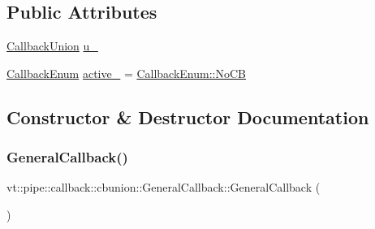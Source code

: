 \subsection*{Public Attributes}
\begin{DoxyCompactItemize}
\item 
\hyperlink{unionvt_1_1pipe_1_1callback_1_1cbunion_1_1_callback_union}{Callback\+Union} \hyperlink{structvt_1_1pipe_1_1callback_1_1cbunion_1_1_general_callback_aed6003f71632d33c5281872d7841cb4f}{u\+\_\+}
\item 
\hyperlink{namespacevt_1_1pipe_1_1callback_1_1cbunion_ac8b41526501e39ec73a5fde238b996b4}{Callback\+Enum} \hyperlink{structvt_1_1pipe_1_1callback_1_1cbunion_1_1_general_callback_ad141aa2bd6b52ff3ac0469c54786649f}{active\+\_\+} = \hyperlink{namespacevt_1_1pipe_1_1callback_1_1cbunion_ac8b41526501e39ec73a5fde238b996b4a29782dfeb3ca8db391fbf8e43f240dc2}{Callback\+Enum\+::\+No\+CB}
\end{DoxyCompactItemize}


\subsection{Constructor \& Destructor Documentation}
\mbox{\label{structvt_1_1pipe_1_1callback_1_1cbunion_1_1_general_callback_a7249abce459f2922bc2454bb45ea1eb4}} 
\subsubsection{\texorpdfstring{General\+Callback()}{GeneralCallback()}\hspace{0.1cm}{\footnotesize\ttfamily [1/12]}}
{\footnotesize\ttfamily vt\+::pipe\+::callback\+::cbunion\+::\+General\+Callback\+::\+General\+Callback (\begin{DoxyParamCaption}{ }\end{DoxyParamCaption})\hspace{0.3cm}{\ttfamily [default]}}

\mbox{\label{structvt_1_1pipe_1_1callback_1_1cbunion_1_1_general_callback_a4c3b634eddc0faa5316aabb0baf0f355}} 
